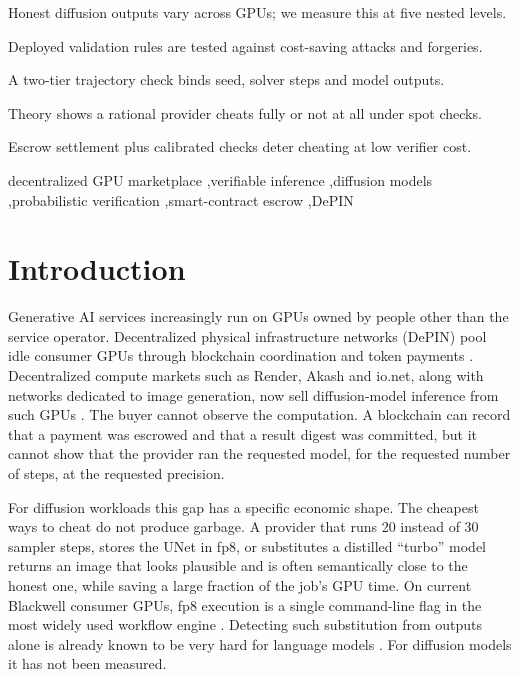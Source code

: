 \documentclass[preprint,review,12pt,authoryear]{elsarticle}
\theoremstyle{definition}
\begin{document}
\begin{frontmatter}
\begin{highlights}
\item Honest diffusion outputs vary across GPUs; we measure this at five nested levels.
\item Deployed validation rules are tested against cost-saving attacks and forgeries.
\item A two-tier trajectory check binds seed, solver steps and model outputs.
\item Theory shows a rational provider cheats fully or not at all under spot checks.
\item Escrow settlement plus calibrated checks deter cheating at low verifier cost.
\end{highlights}

\begin{keyword}
decentralized GPU marketplace \sep verifiable inference \sep diffusion models \sep probabilistic verification \sep smart-contract escrow \sep DePIN
\end{keyword}

\end{frontmatter}

\section{Introduction}\label{sec:intro}

Generative AI services increasingly run on GPUs owned by people other than the service operator. Decentralized physical infrastructure networks (DePIN) pool idle consumer GPUs through blockchain coordination and token payments \citep{ballandies2023depin,lin2024depin}. Decentralized compute markets such as Render, Akash and io.net, along with networks dedicated to image generation, now sell diffusion-model inference from such GPUs \citep{render2023,akash2026,ionet2026}. The buyer cannot observe the computation. A blockchain can record that a payment was escrowed and that a result digest was committed, but it cannot show that the provider ran the requested model, for the requested number of steps, at the requested precision.

For diffusion workloads this gap has a specific economic shape. The cheapest ways to cheat do not produce garbage. A provider that runs 20 instead of 30 sampler steps, stores the UNet in fp8, or substitutes a distilled ``turbo'' model returns an image that looks plausible and is often semantically close to the honest one, while saving a large fraction of the job's GPU time. On current Blackwell consumer GPUs, fp8 execution is a single command-line flag in the most widely used workflow engine \citep{comfyui}. Detecting such substitution from outputs alone is already known to be very hard for language models \citep{cai2025substitution,gao2025met}. For diffusion models it has not been measured.
\end{document}
